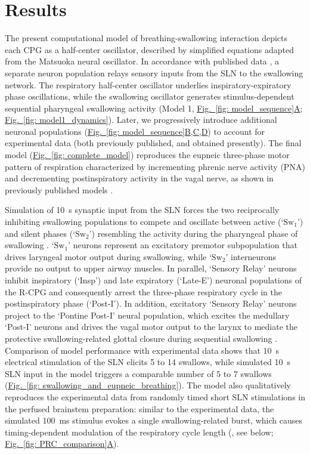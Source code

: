 \documentclass[pdflatex,sn-mathphys-ay]{sn-jnl}%
\renewcommand{\figureautorefname}{Fig.}
\newcommand{\Figref}[2][]{\hyperref[#2]{\figureautorefname~\ref*{#2}#1}}
\theoremstyle{thmstyleone}%
\theoremstyle{thmstyletwo}%
\theoremstyle{thmstylethree}%
\begin{document}
\section{Results}\label{sec: results}
The present computational model of breathing-swallowing interaction depicts each CPG as a half-center oscillator, described by simplified equations adapted from the Matsuoka neural oscillator. In accordance with published data \citep{fuse2025spatio}, a separate neuron population relays sensory inputs from the SLN to the swallowing network. The respiratory half-center oscillator underlies inspiratory-expiratory phase oscillations, while the swallowing oscillator generates stimulus-dependent sequential pharyngeal swallowing activity (Model 1, \Figref[A]{fig: model_sequence}; \Figref[]{fig: model1_dynamics}). Later, we progressively introduce additional neuronal populations (\Figref[B,C,D]{fig: model_sequence}) to account for experimental data (both previously published, and obtained presently). The final model (\Figref[]{fig: complete_model}) reproduces the eupneic three-phase motor pattern of respiration characterized by incrementing phrenic nerve activity (PNA) and decrementing postinspiratory activity in the vagal nerve, as shown in previously published models \citep{rybak2004modeling, smith2007spatial}.

Simulation of 10~s synaptic input from the SLN forces the two reciprocally inhibiting swallowing populations to compete and oscillate between active (`$\text{Sw}_1$') and silent phases (`$\text{Sw}_2$') resembling the activity during the pharyngeal phase of swallowing \citep{hashimoto2019activity, bautista2014generation, kinoshita2021influences, jean2001brain}. `$\text{Sw}_1$' neurons represent an excitatory premotor subpopulation that drives laryngeal motor output during swallowing, while `$\text{Sw}_2$' interneurons provide no output to upper airway muscles. In parallel, `Sensory Relay' neurons inhibit inspiratory (`Insp') and late expiratory (`Late-E') neuronal populations of the R-CPG and consequently arrest the three-phase respiratory cycle in the postinspiratory phase (`Post-I'). In addition, excitatory `Sensory Relay' neurons project to the `Pontine Post-I' neural population, which excites the medullary `Post-I' neurons and drives the vagal motor output to the larynx to mediate the protective swallowing-related glottal closure during sequential swallowing \citep{bautista2014ponto}. Comparison of model performance with experimental data shows that 10~s electrical stimulation of the SLN elicits 5 to 14 swallows, while simulated 10~s SLN input in the model triggers a comparable number of 5 to 7 swallows (\Figref[]{fig: swallowing_and_eupneic_breathing}). The model also qualitatively reproduces the experimental data from randomly timed short SLN stimulations in the perfused brainstem preparation: similar to the experimental data, the simulated 100~ms stimulus evokes a single swallowing-related burst, which causes timing-dependent modulation of the respiratory cycle length (\citet{lewis1990effects, oku1992phase}, see below; \Figref[A]{fig: PRC_comparison}).
\end{document}
